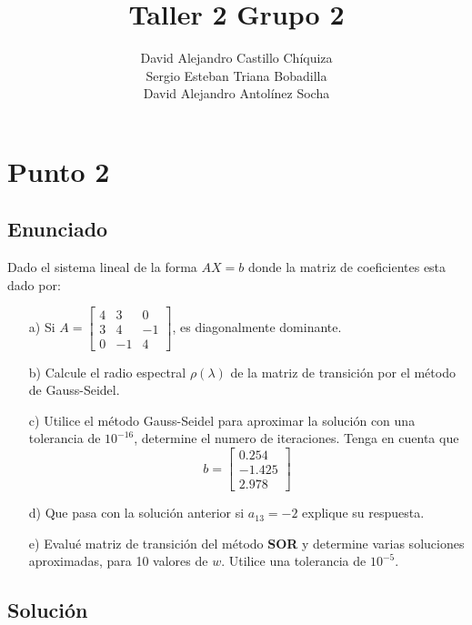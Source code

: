 \documentclass[10pt,letterpaper]{article}
\author{David Alejandro Castillo Chíquiza \\Sergio Esteban Triana Bobadilla \\David Alejandro Antolínez Socha}
\title{Taller 2 Grupo 2}
\begin{document}
\maketitle

\section{Punto 2}

	\subsection{Enunciado}
	
	Dado el sistema lineal de la forma $AX=b$ donde la matriz de coeficientes esta dado por:
	\begin{center}
	
		\begin{enumerate}
		
			\item[a)] Si $ A=\begin{bmatrix}4 & 3 & 0\\ 3 & 4 & -1 \\ 0 & -1 & 4 \end{bmatrix}$, es diagonalmente dominante.
			
			\item[b)] Calcule el radio espectral $\rho(\lambda)$ de la matriz de transición por el método de Gauss-Seidel.
			
			\item[c)] Utilice el método Gauss-Seidel para aproximar la solución con una tolerancia de $10^{-16}$, determine el numero de iteraciones. Tenga en cuenta que $$ b=\begin{bmatrix} 0.254 \\ -1.425 \\ 2.978  \end{bmatrix}$$
			
			\item[d)] Que pasa con la solución anterior si $a_{13}=-2$ explique su respuesta.
			
			\item[e)] Evalué matriz de transición del método \textbf{SOR} y determine varias soluciones aproximadas, para 10 valores de $w$. Utilice una tolerancia de $10^{-5}$.
		
		\end{enumerate}
		
	\end{center}
	
	\subsection{Solución}
		
\end{document}
